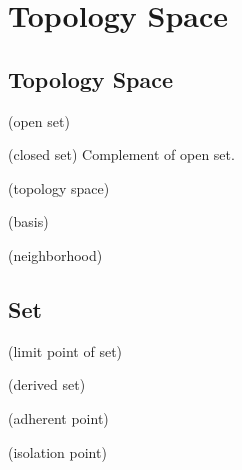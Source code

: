 \chapter{Topology Space}

\section{Topology Space}

\begin{definition}
(open set)
\end{definition}

\begin{definition}
(closed set) Complement of open set. 
\end{definition}

\begin{definition}
(topology space)
\end{definition}

\begin{definition}
\end{definition}

\begin{theorem}
\end{theorem}

\begin{definition}
(basis)
\end{definition}

\begin{definition}
(neighborhood)
\end{definition}

\section{Set}

\begin{definition}
\label{definition:limit point of set}
(limit point of set)
\end{definition}

\begin{definition}
(derived set)
\end{definition}

\begin{definition}
(adherent point)
\end{definition}

\begin{definition}
(isolation point)
\end{definition}


